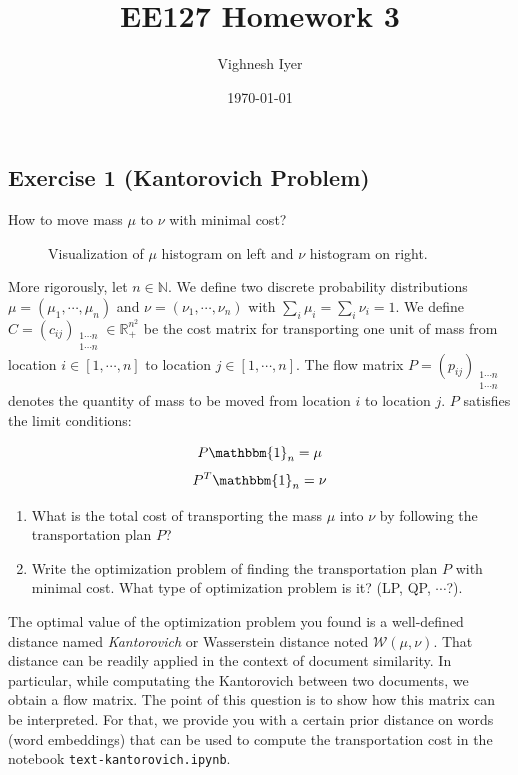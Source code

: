 \documentclass[11pt]{article}
\begin{document}
\title{EE127 Homework 3}
\author{Vighnesh Iyer}
\date{\today}
\maketitle

\subsection*{Exercise 1 (Kantorovich Problem)}

How to move mass $\mu$ to $\nu$ with minimal cost?

\begin{figure}[ht]
\centering
\caption{Visualization of $\mu$ histogram on left and $\nu$ histogram on right.}
\label{fig:histogram}
\end{figure}

More rigorously, let $n \in \mathbb{N}$. We define two discrete probability distributions $\mu = (\mu_1, \cdots, \mu_n)$ and $\nu = (\nu_1, \cdots, \nu_n)$ with $\sum_i \mu_i = \sum_i \nu_i = 1$. We define $C = (c_{ij})_{\substack{{1\cdots n} \\ {1\cdots n}}} \in \mathbb{R}_+^{n^2}$ be the cost matrix for transporting one unit of mass from location $i \in [1, \cdots, n]$ to location $j \in [1, \cdots, n]$. The flow matrix $P = (p_{ij})_{\substack{{1 \cdots n} \\ {1 \cdots n}}}$ denotes the quantity of mass to be moved from location $i$ to location $j$. $P$ satisfies the limit conditions:

\[
P \mathbbm{1}_n = \mu
\]
\[
P^T \mathbbm{1}_n = \nu
\]

\begin{enumerate}

\item What is the total cost of transporting the mass $\mu$ into $\nu$ by following the transportation plan $P$?

\item Write the optimization problem of finding the transportation plan $P$ with minimal cost. What type of optimization problem is it? (LP, QP, $\cdots$?).

\end{enumerate}

The optimal value of the optimization problem you found is a well-defined distance named \emph{Kantorovich} or Wasserstein distance noted $\mathcal{W}(\mu, \nu)$. That distance can be readily applied in the context of document similarity. In particular, while computating the Kantorovich between two documents, we obtain a flow matrix. The point of this question is to show how this matrix can be interpreted. For that, we provide you with a certain prior distance on words (word embeddings) that can be used to compute the transportation cost in the notebook \verb+text-kantorovich.ipynb+.
\end{document}
